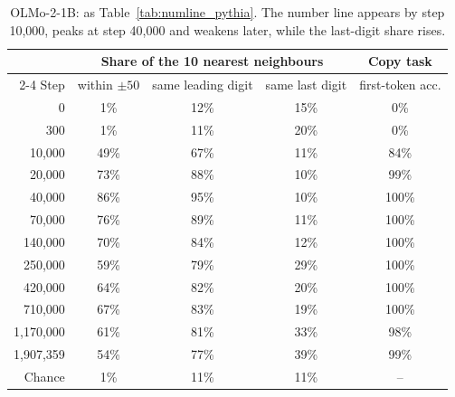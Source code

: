 \documentclass[11pt]{article}
\begin{document}
\begin{table}[ht]
\centering
\small
\begin{tabular}{rcccc}
\toprule
 & \multicolumn{3}{c}{Share of the 10 nearest neighbours} & Copy task \\
\cmidrule(lr){2-4}
Step & within $\pm 50$ & same leading digit & same last digit & first-token acc. \\
\midrule
0 & 1\% & 12\% & 15\% & 0\% \\
300 & 1\% & 11\% & 20\% & 0\% \\
10{,}000 & 49\% & 67\% & 11\% & 84\% \\
20{,}000 & 73\% & 88\% & 10\% & 99\% \\
40{,}000 & 86\% & 95\% & 10\% & 100\% \\
70{,}000 & 76\% & 89\% & 11\% & 100\% \\
140{,}000 & 70\% & 84\% & 12\% & 100\% \\
250{,}000 & 59\% & 79\% & 29\% & 100\% \\
420{,}000 & 64\% & 82\% & 20\% & 100\% \\
710{,}000 & 67\% & 83\% & 19\% & 100\% \\
1{,}170{,}000 & 61\% & 81\% & 33\% & 98\% \\
1{,}907{,}359 & 54\% & 77\% & 39\% & 99\% \\
\midrule
Chance & 1\% & 11\% & 11\% & -- \\
\bottomrule
\end{tabular}
\caption{OLMo-2-1B: as Table~\ref{tab:numline_pythia}. The number line appears by step 10{,}000, peaks at step 40{,}000 and weakens later, while the last-digit share rises.}
\label{tab:numline_olmo}
\end{table}
\end{document}
